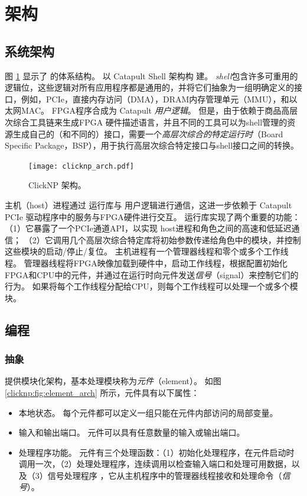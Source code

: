 \section{架构}
\label{clicknp:sec:architecture}

\subsection{系统架构}
\label{clicknp:subsec:sysarch}

图 \ref{clicknp:fig:clicknp} 显示了 \name 的体系结构。
\name 以 Catapult Shell 架构构 建\cite {putnam2014reconfigurable}。
\textit {shell}包含许多可重用的逻辑位，这些逻辑对所有应用程序都是通用的，并将它们抽象为一组明确定义的接口，例如，PCIe，直接内存访问（DMA），DRAM内存管理单元（MMU），和以太网MAC。
\name FPGA程序合成为 Catapult \textit {用户逻辑}。
但是，由于\name 依赖于商品高层次综合工具链来生成FPGA 硬件描述语言，并且不同的工具可以为shell管理的资源生成自己的（和不同的）接口，需要一个\textit {高层次综合的特定运行时}（Board Specific Package，BSP），用于执行高层次综合特定接口与shell接口之间的转换。


\begin{figure}
	\centering
	\texttt{[image: clicknp\_arch.pdf]}
	\caption{ClickNP 架构。}
	\label{clicknp:fig:clicknp}
\end{figure}


\name{} 主机（host）进程通过 \name{} 运行库与 \name{} 用户逻辑进行通信，这进一步依赖于 Catapult PCIe 驱动程序中的服务与FPGA硬件进行交互。
\name{} 运行库实现了两个重要的功能：
（1）它暴露了一个PCIe通道API，以实现 \name{} host进程和角色之间的高速和低延迟通信；
（2）它调用几个高层次综合特定库将初始参数传递给角色中的模块，并控制这些模块的启动/停止/复位。
\name{} 主机进程有一个管理器线程和零个或多个工作线程。
管理器线程将FPGA映像加载到硬件中，启动工作线程，根据配置初始化FPGA和CPU中的\name 元件，并通过在运行时向元件发送\textit {信号}（signal）来控制它们的行为。
如果将每个工作线程分配给CPU，则每个工作线程可以处理一个或多个模块。

\subsection{\name 编程}

\subsubsection{抽象}

\name 提供模块化架构，基本处理模块称为\textit{元件}（element）。
如图 \ref{clicknp:fig:element_arch} 所示，\name 元件具有以下属性：
\begin{itemize}
\item 本地状态。 每个元件都可以定义一组只能在元件内部访问的局部变量。
\item 输入和输出端口。 元件可以具有任意数量的输入或输出端口。
\item 处理程序功能。 元件有三个处理函数：（1）初始化处理程序，在元件启动时调用一次，（2）处理处理程序，连续调用以检查输入端口和处理可用数据，以及（3）信号处理程序 ，它从主机程序中的管理器线程接收和处理命令（\textit {信号}）。
\end{itemize}

